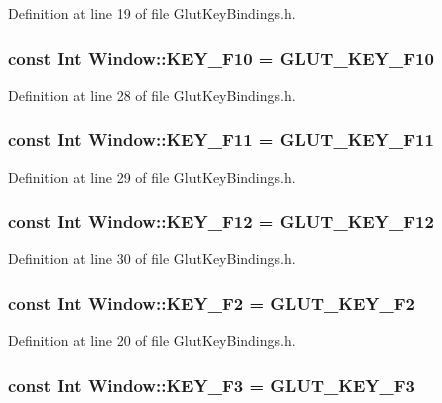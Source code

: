 Definition at line 19 of file Glut\-Key\-Bindings.h.
\subsubsection{\setlength{\rightskip}{0pt plus 5cm}const {\bf Int} Window::KEY\_\-F10 = GLUT\_\-KEY\_\-F10\hspace{0.3cm}{\tt  [static]}}\label{classdg_1_1Window_p20}




Definition at line 28 of file Glut\-Key\-Bindings.h.
\subsubsection{\setlength{\rightskip}{0pt plus 5cm}const {\bf Int} Window::KEY\_\-F11 = GLUT\_\-KEY\_\-F11\hspace{0.3cm}{\tt  [static]}}\label{classdg_1_1Window_p21}




Definition at line 29 of file Glut\-Key\-Bindings.h.
\subsubsection{\setlength{\rightskip}{0pt plus 5cm}const {\bf Int} Window::KEY\_\-F12 = GLUT\_\-KEY\_\-F12\hspace{0.3cm}{\tt  [static]}}\label{classdg_1_1Window_p22}




Definition at line 30 of file Glut\-Key\-Bindings.h.
\subsubsection{\setlength{\rightskip}{0pt plus 5cm}const {\bf Int} Window::KEY\_\-F2 = GLUT\_\-KEY\_\-F2\hspace{0.3cm}{\tt  [static]}}\label{classdg_1_1Window_p12}




Definition at line 20 of file Glut\-Key\-Bindings.h.
\subsubsection{\setlength{\rightskip}{0pt plus 5cm}const {\bf Int} Window::KEY\_\-F3 = GLUT\_\-KEY\_\-F3\hspace{0.3cm}{\tt  [static]}}\label{classdg_1_1Window_p13}




